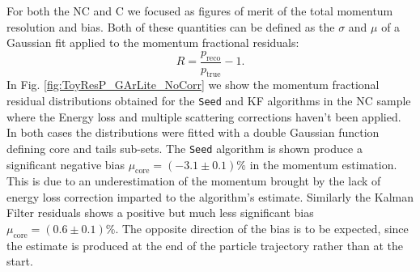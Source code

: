 For both the NC and C we focused as figures of merit of the total momentum resolution and bias. Both of these quantities can be defined as the $\sigma$ and $\mu$ of a Gaussian fit applied to the momentum fractional residuals:
\begin{equation}
    \label{eq:MomentumRes}
    R = \frac{p_{\text{reco}}}{p_{\text{true}}} - 1.
\end{equation}
In Fig. \ref{fig:ToyResP_GArLite_NoCorr} we show the momentum fractional residual distributions obtained for the \texttt{Seed} and KF algorithms in the NC sample where the Energy loss and multiple scattering corrections haven't been applied. In both cases the distributions were fitted with a double Gaussian function defining core and tails sub-sets. The \texttt{Seed} algorithm is shown produce a significant negative bias $\mu_\text{core}=(-3.1\pm0.1)\%$ in the momentum estimation. This is due to an underestimation of the momentum brought by the lack of energy loss correction imparted to the algorithm's estimate. Similarly the Kalman Filter residuals shows a positive but much less significant bias $\mu_\text{core}=(0.6\pm0.1)\%$. The opposite direction of the bias is to be expected, since the estimate is produced at the end of the particle trajectory rather than at the start.


